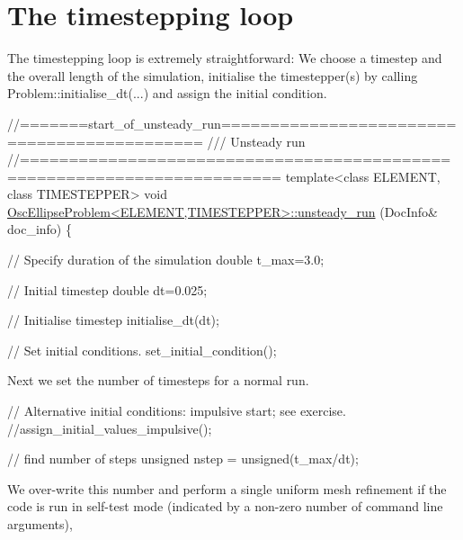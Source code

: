  

\hypertarget{index_unsteady_run}{}\section{The timestepping loop}\label{index_unsteady_run}
The timestepping loop is extremely straightforward\+: We choose a timestep and the overall length of the simulation, initialise the timestepper(s) by calling {\ttfamily Problem\+::initialise\+\_\+dt}(...) and assign the initial condition.


\begin{DoxyCodeInclude}
\textcolor{comment}{//=======start\_of\_unsteady\_run============================================}
\textcolor{comment}{/// Unsteady run}
\textcolor{comment}{}\textcolor{comment}{//========================================================================}
\textcolor{keyword}{template}<\textcolor{keyword}{class} ELEMENT, \textcolor{keyword}{class} TIMESTEPPER>
\textcolor{keywordtype}{void} \hyperlink{classOscEllipseProblem_ad0d879edbbd8b09b61e802ab66ef98a3}{OscEllipseProblem<ELEMENT,TIMESTEPPER>::unsteady\_run}
      (DocInfo& doc\_info)
\{

 \textcolor{comment}{// Specify duration of the simulation}
 \textcolor{keywordtype}{double} t\_max=3.0;

 \textcolor{comment}{// Initial timestep}
 \textcolor{keywordtype}{double} dt=0.025;

 \textcolor{comment}{// Initialise timestep}
 initialise\_dt(dt);

 \textcolor{comment}{// Set initial conditions.}
 set\_initial\_condition();

\end{DoxyCodeInclude}


Next we set the number of timesteps for a normal run.


\begin{DoxyCodeInclude}

 \textcolor{comment}{// Alternative initial conditions: impulsive start; see exercise.}
 \textcolor{comment}{//assign\_initial\_values\_impulsive(); }

 \textcolor{comment}{// find number of steps}
 \textcolor{keywordtype}{unsigned} nstep = unsigned(t\_max/dt);

\end{DoxyCodeInclude}


We over-\/write this number and perform a single uniform mesh refinement if the code is run in self-\/test mode (indicated by a non-\/zero number of command line arguments),


